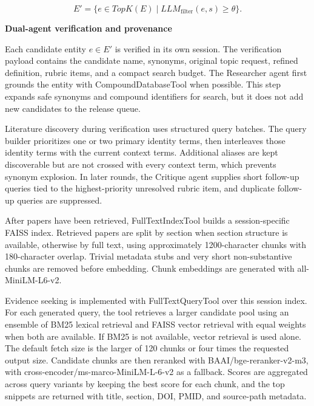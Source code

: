 \documentclass[
]{article}
\begin{document}
\[E' = \{e \in TopK(E) \mid LLM_{\text{filter}}(e,s) \geq \theta\}.\]

\textbf{Dual-agent verification and provenance}

Each candidate entity \(e \in E'\) is verified in its own session. The
verification payload contains the candidate name, synonyms, original
topic request, refined definition, rubric items, and a compact search
budget. The Researcher agent first grounds the entity with
CompoundDatabaseTool when possible. This step expands safe synonyms and
compound identifiers for search, but it does not add new candidates to
the release queue.

Literature discovery during verification uses structured query batches.
The query builder prioritizes one or two primary identity terms, then
interleaves those identity terms with the current context terms.
Additional aliases are kept discoverable but are not crossed with every
context term, which prevents synonym explosion. In later rounds, the
Critique agent supplies short follow-up queries tied to the
highest-priority unresolved rubric item, and duplicate follow-up queries
are suppressed.

After papers have been retrieved, FullTextIndexTool builds a
session-specific FAISS index. Retrieved papers are split by section when
section structure is available, otherwise by full text, using
approximately 1200-character chunks with 180-character overlap. Trivial
metadata stubs and very short non-substantive chunks are removed before
embedding. Chunk embeddings are generated with all-MiniLM-L6-v2.

Evidence seeking is implemented with FullTextQueryTool over this session
index. For each generated query, the tool retrieves a larger candidate
pool using an ensemble of BM25 lexical retrieval and FAISS vector
retrieval with equal weights when both are available. If BM25 is not
available, vector retrieval is used alone. The default fetch size is the
larger of 120 chunks or four times the requested output size. Candidate
chunks are then reranked with BAAI/bge-reranker-v2-m3, with
cross-encoder/ms-marco-MiniLM-L-6-v2 as a fallback. Scores are
aggregated across query variants by keeping the best score for each
chunk, and the top snippets are returned with title, section, DOI, PMID,
and source-path metadata.
\end{document}
